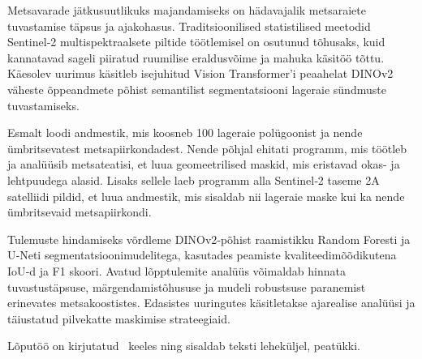 Metsavarade jätkusuutlikuks majandamiseks on hädavajalik metsaraiete tuvastamise täpsus ja ajakohasus. Traditsioonilised statistilised meetodid Sentinel‑2 multispektraalsete piltide töötlemisel on osutunud tõhusaks, kuid kannatavad sageli piiratud ruumilise eraldusvõime ja mahuka käsitöö tõttu. Käesolev uurimus käsitleb isejuhitud Vision Transformer’i peaahelat DINOv2 väheste õppeandmete põhist semantilist segmentatsiooni lageraie sündmuste tuvastamiseks.

Esmalt loodi andmestik, mis koosneb 100 lageraie polügoonist ja nende ümbritsevatest metsapiirkondadest. Nende põhjal ehitati programm, mis töötleb ja analüüsib metsateatisi, et luua geomeetrilised maskid, mis eristavad okas- ja lehtpuudega alasid. Lisaks sellele laeb programm alla Sentinel‑2 taseme 2A satelliidi pildid, et luua andmestik, mis sisaldab nii lageraie maske kui ka nende ümbritsevaid metsapiirkondi.

Tulemuste hindamiseks võrdleme DINOv2‑põhist raamistikku Random Foresti ja U‑Neti segmentatsioonimudelitega, kasutades peamiste kvaliteedimõõdikutena IoU‑d ja F1 skoori. Avatud lõpptulemite analüüs võimaldab hinnata tuvastustäpsuse, märgendamistõhususe ja mudeli robustsuse paranemist erinevates metsakoostistes. Edasistes uuringutes käsitletakse ajarealise analüüsi ja täiustatud pilvekatte maskimise strateegiaid.

Lõputöö on kirjutatud \langEst~keeles ning sisaldab teksti \calculatepages leheküljel, 
 peatükki.